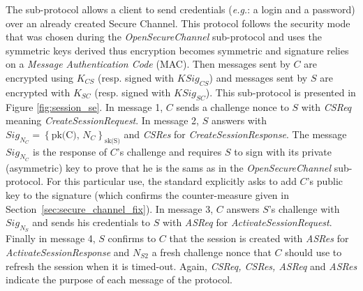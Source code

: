 \newcommand{\csreq}{CSReq}
\newcommand{\csres}{CSRes}
\newcommand{\asreq}{ASReq}
\newcommand{\asres}{ASRes}

The  sub-protocol allows a client to send
credentials (\emph{e.g.}: a login and a password) over an already
created Secure Channel.  This protocol follows the security mode that
was chosen during the {\em OpenSecureChannel} sub-protocol and uses
the symmetric keys derived thus encryption becomes symmetric and
signature relies on a \emph{Message Authentication Code} (MAC).  Then
messages sent by $C$ are encrypted using $K_{CS}$ (resp. signed with
$KSig_{CS}$) and messages sent by $S$ are encrypted with $K_{SC}$
(resp. signed with $KSig_{SC}$).  This sub-protocol is presented in
Figure \ref{fig:session_se}.  In message 1, $C$ sends a challenge
nonce to $S$ with {\em CSReq} meaning {\em CreateSessionRequest}.  In
message 2, $S$ answers with $Sig_{N_{C}} = \left\{\mbox{pk(C),
  $N_{C}$}\right\}_{\mbox{sk(S)}}$ and {\em CSRes} for {\em
  CreateSessionResponse}. The message $Sig_{N_{C}}$ is the response of $C$'s
challenge and requires $S$ to sign with its private (asymmetric) key
to prove that he is the sams as in the {\em OpenSecureChannel}
sub-protocol.  For this particular use, the \opcua standard explicitly
asks to add $C$'s public key to the signature (which confirms the
counter-measure given in Section~\ref{sec:secure_channel_fix}).  In
message 3, $C$ answers $S$'s challenge with $Sig_{N_{S}}$ and sends
his credentials to $S$ with {\em ASReq} for {\em
  ActivateSessionRequest}.  Finally in message 4, $S$ confirms to $C$
that the session is created with {\em ASRes} for {\em
  ActivateSessionResponse} and $N_{S2}$ a fresh challenge nonce that
$C$ should use to refresh the session when it is timed-out.  Again,
{\em CSReq, CSRes, ASReq} and {\em ASRes} indicate the purpose of each
message of the protocol.

